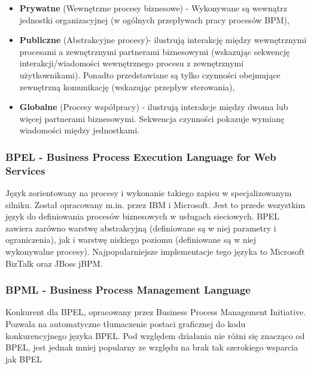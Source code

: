 \begin{itemize}
	\item \textbf{Prywatne} (Wewnętrzne procesy biznesowe) - Wykonywane są wewnątrz jednostki organizacyjnej (w ogólnych przepływach pracy procesów BPM),
	\item \textbf{Publiczne} (Abstrakcyjne procesy)- ilustrują interakcję między wewnętrznymi procesami a zewnętrznymi partnerami biznesowymi (wskazując sekwencję interakcji/wiadomości wewnętrznego procesu z zewnętrznymi użytkownikami). Ponadto przedstawiane są tylko czynności obejmujące zewnętrzną komunikację (wskazując przepływ sterowania),
	\item \textbf{Globalne} (Procesy współpracy) - ilustrują interakcje między dwoma lub więcej partnerami biznesowymi. Sekwencja czynności pokazuje wymianę wiadomości między jednostkami.
\end{itemize}

\subsubsection{BPEL - Business Process Execution Language for Web Services}

Język zorientowany na procesy i wykonanie takiego zapisu w specjalizowanym silniku. Został opracowany m.in. przez IBM i Microsoft. Jest to przede wszystkim język do definiowania procesów biznesowych w usługach sieciowych. BPEL zawiera zarówno warstwę abstrakcyjną (definiowane są w niej parametry i ograniczenia), jak i warstwę niskiego poziomu (definiowane są w niej wykonywalne procesy). Najpopularniejsze implementacje tego języka to Microsoft BizTalk oraz JBoss jBPM.

\subsubsection{BPML - Business Process Management Language}

Konkurent dla BPEL, opracowany przez Business Process Management Initiative. Pozwala na automatyczne tłumaczenie postaci graficznej do kodu konkurencyjnego języka BPEL. Pod względem działania nie różni się znacząco od BPEL, jest jednak mniej popularny ze względu na brak tak szerokiego wsparcia jak BPEL
